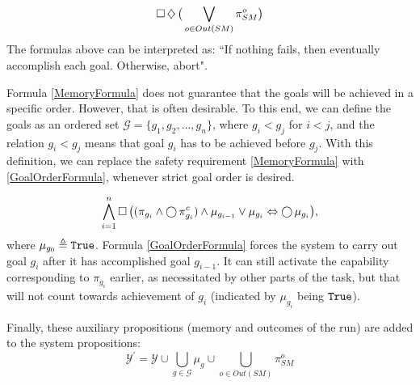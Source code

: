 \begin{equation}\label{SuccessLivenessFormula}
	\operatorname{\Box} \operatorname{\diamondsuit} \big( \bigvee \limits_{o \in Out(SM)} \pi_{SM}^{o} \big)
\end{equation}
The formulas above can be interpreted as: ``If nothing fails, then eventually accomplish each goal. Otherwise, abort". 

Formula \eqref{MemoryFormula} does not guarantee that the goals will be achieved in a specific order.
However, that is often desirable.
To this end, we can define the goals as an ordered set $\mathcal{G} = \{ g_1, g_2, \ldots, g_n \}$, where $g_i < g_j$ for $i<j$, and the relation $g_i < g_j$ means that goal $g_i$ has to be achieved before $g_j$.
With this definition, we can replace the safety requirement \eqref{MemoryFormula} with \eqref{GoalOrderFormula}, whenever strict goal order is desired.

\begin{equation}\label{GoalOrderFormula}
	\bigwedge \limits_{i = 1}^n \operatorname{\Box} \big( (\pi_{g_i} \wedge \operatorname{\bigcirc} \pi_{g_i}^c) \wedge \mu_{g_{i-1}} \vee \mu_{g_i} \Leftrightarrow \operatorname{\bigcirc} \mu_{g_i} \big),
\end{equation}
where $\mu_{g_0} \triangleq \mathtt{True}$.
Formula \eqref{GoalOrderFormula} forces the system to carry out goal $g_i$ after it has accomplished goal $g_{i-1}$.
It can still activate the capability corresponding to $\pi_{g_i}$ earlier, as necessitated by other parts of the task, but that will not count towards achievement of $g_i$ (indicated by $\mu_{g_i}$ being $\mathtt{True}$).

Finally, these auxiliary propositions (memory and outcomes of the run) are added to the system propositions: $$\mathcal{Y}^\prime = \mathcal{Y} \cup \bigcup \limits_{g \in \mathcal{G}} \mu_g \cup \bigcup \limits_{o \in Out(SM)} \pi_{SM}^o$$

